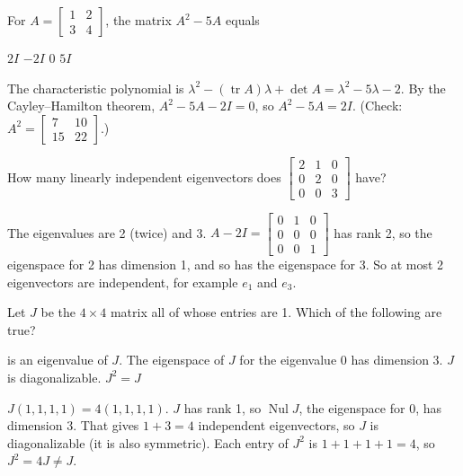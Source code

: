\begin{question}[id=eig-11, marks=2]
For $A = \begin{bmatrix} 1 & 2 \\ 3 & 4 \end{bmatrix}$, the matrix $A^2 - 5A$ equals
\begin{options}
  \correct $2I$
  \option $-2I$
  \option $0$
  \option $5I$
\end{options}
\begin{solution}
The characteristic polynomial is $\lambda^2 - (\operatorname{tr} A)\lambda + \det A = \lambda^2 - 5\lambda - 2$. By the Cayley--Hamilton theorem, $A^2 - 5A - 2I = 0$, so $A^2 - 5A = 2I$. (Check: $A^2 = \begin{bmatrix} 7 & 10 \\ 15 & 22 \end{bmatrix}$.)
\end{solution}
\end{question}

\begin{question}[id=eig-12]
How many linearly independent eigenvectors does $\begin{bmatrix} 2 & 1 & 0 \\ 0 & 2 & 0 \\ 0 & 0 & 3 \end{bmatrix}$ have?
\begin{solution}
The eigenvalues are 2 (twice) and 3. $A - 2I = \begin{bmatrix} 0 & 1 & 0 \\ 0 & 0 & 0 \\ 0 & 0 & 1 \end{bmatrix}$ has rank 2, so the eigenspace for 2 has dimension 1, and so has the eigenspace for 3. So at most 2 eigenvectors are independent, for example $e_1$ and $e_3$.
\end{solution}
\end{question}

\begin{question}[id=eig-13, type=msq, marks=2]
Let $J$ be the $4 \times 4$ matrix all of whose entries are 1. Which of the following are true?
\begin{options}
   is an eigenvalue of $J$.
  \correct The eigenspace of $J$ for the eigenvalue 0 has dimension 3.
  \correct $J$ is diagonalizable.
  \option $J^2 = J$
\end{options}
\begin{solution}
$J(1, 1, 1, 1) = 4(1, 1, 1, 1)$. $J$ has rank 1, so $\operatorname{Nul} J$, the eigenspace for 0, has dimension 3. That gives $1 + 3 = 4$ independent eigenvectors, so $J$ is diagonalizable (it is also symmetric). Each entry of $J^2$ is $1 + 1 + 1 + 1 = 4$, so $J^2 = 4J \ne J$.
\end{solution}
\end{question}

